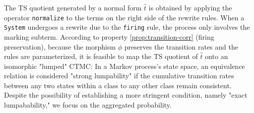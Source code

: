 The TS quotient generated by a normal form $\hat{t}$ is obtained by applying the operator \verb|normalize| to the terms on the right side of the rewrite rules. When a \verb|System| undergoes a rewrite due to the \verb|firing| rule, the process only involves the marking subterm.
According to property \ref{prop:transition-corr} (firing preservation), because the morphism $\phi$ preserves the transition rates and the rules are parameterized, it is feasible to map the TS quotient of $\hat{t}$ onto an isomorphic "lumped" CTMC: In a Markov process's state space, an equivalence relation is considered "strong lumpability" if the cumulative transition rates between any two states within a class to any other class remain consistent. Despite the possibility of establishing a more stringent condition, namely "exact lumpabability," we focus on the aggregated probability.



